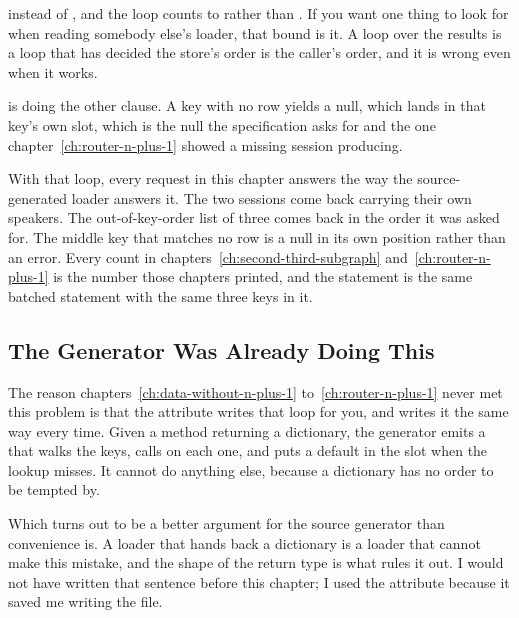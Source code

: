 %
 instead of , and the loop counts to
 rather than . If you want one thing to look
for when reading somebody else's loader, that bound is it. A loop over the
results is a loop that has decided the store's order is the caller's order, and
it is wrong even when it works.

%
 is doing the other clause. A key with no row yields a
null, which lands in that key's own slot, which is the null the specification
asks for and the one chapter~\ref{ch:router-n-plus-1} showed a missing session
producing.

%
With that loop, every request in this chapter answers the way the
source-generated loader answers it. The two sessions come back carrying their
own speakers. The out-of-key-order list of three comes back in the order it was
asked for. The middle key that matches no row is a null in its own position
rather than an error. Every count in
chapters~\ref{ch:second-third-subgraph} and~\ref{ch:router-n-plus-1} is the
number those chapters printed, and the statement is the same batched statement
with the same three keys in it.

\subsection{The Generator Was Already Doing This}

%
The reason chapters~\ref{ch:data-without-n-plus-1}
to~\ref{ch:router-n-plus-1} never met this problem is that
the \code{[DataLoader]} attribute writes that loop for you, and writes it the
same way every time. Given a method returning a dictionary, the generator emits a
 that walks the keys, calls  on each one,
and puts a default in the slot when the lookup misses. It cannot do anything
else, because a dictionary has no order to be tempted by.

%
Which turns out to be a better argument for the source generator than
convenience is. A loader that hands back a dictionary is a loader that cannot
make this mistake, and the shape of the return type is what rules it out. I
would not have written that sentence before this chapter; I used
the attribute because it saved me writing the file.

